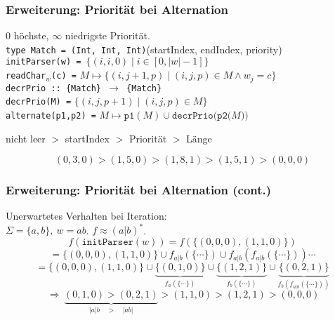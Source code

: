 \documentclass{beamer}
\begin{document}
    \begin{frame}[t]
        \frametitle{Erweiterung: Priorität bei Alternation}
        0 höchste, $\infty$ niedrigste Priorität.\\[10pt]
        \texttt{type Match = (Int, Int, Int)}\hfill(startIndex, endIndex, priority)\\[5pt]
        \texttt{initParser(w) = $\{(i,i,0)\mid i \in [0,|w|-1]\}$}\\[10pt]
        \pause
        \texttt{readChar$_w$(c) =}
            $M \mapsto \{(i,j+1,p) \mid (i,j,p) \in M \land w_j = c\}$\\[10pt]
        \pause
        \texttt{decrPrio ::\ \{Match\} $\to$ \{Match\}}\\
        \texttt{decrPrio(M) =}
            $\{(i,j,p+1) \mid (i,j,p) \in M\}$\\[15pt]
        \pause
        \texttt{alternate(p1,p2) =} $M \mapsto \texttt{p1}(M) \cup \texttt{decrPrio(p2($M$))}$\\[25pt]
        \pause
        \begin{center}
            nicht leer $>$ startIndex $>$ Priorität $>$ Länge
        \end{center}
        $$
            (0,3,0) > (1,5,0) > (1,8,1) > (1,5,1) > (0,0,0)
        $$
    \end{frame}

    \begin{frame}[t]
        \frametitle{Erweiterung: Priorität bei Alternation (cont.)}
        Unerwartetes Verhalten bei Iteration:\\
        $\Sigma = \{a,b\},\ w = ab$. $f \approx (a|b)^*$.
        \pause
        $$
            f(\texttt{initParser}(w)) = f(\{(0,0,0),(1,1,0)\})
        $$$$
            = \{(0,0,0),(1,1,0)\} \cup f_{a|b}(\{\cdots\}) \cup f_{a|b}(f_{a|b}(\{\cdots\})) \cdots
        $$$$
            = \{(0,0,0),(1,1,0)\}
            \cup \underbrace{\{(0,1,0)\}}_{f_a(\{\cdots\})}
            \cup \underbrace{\{(1,2,1)\}}_{f_b(\{\cdots\})}
            \cup \underbrace{\{(0,2,1)\}}_{f_b(f_{a|b}(\{\cdots\}))}
        $$
        \pause
        $$
            \,\Longrightarrow\, \underbrace{(0,1,0) > (0,2,1)}_{|a|b\quad >\quad |ab|} > (1,1,0) > (1,2,1) > (0,0,0)
        $$
    \end{frame}
\end{document}
